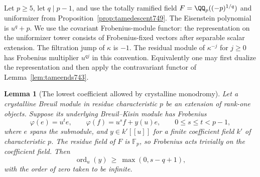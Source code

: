 \documentclass[a4paper,11pt]{article}
\newtheorem{lemma}[proposition]{Lemma}
\theoremstyle{definition}
\theoremstyle{remark}
\numberwithin{equation}{section}
\begin{document}
Let \(p\ge5\), let \(q\mid p-1\), and use the totally ramified
field \(F=\QQ_p((-p)^{1/q})\) and uniformizer from
Proposition~\ref{prop:tamedescent749}. The Eisenstein polynomial
is \(u^q+p\). We use the covariant Frobenius-module functor:
the representation on the uniformizer tower consists of
Frobenius-fixed vectors after separable scalar extension.
The filtration jump of \(\kappa\) is \(-1\).
The residual module of \(\kappa^{-j}\) for \(j\ge0\) has
Frobenius multiplier \(u^{qj}\) in this convention. Equivalently
one may first dualize the representation and then apply the
contravariant functor of Lemma~\ref{lem:tameends743}.

\begin{lemma}[The lowest coefficient allowed by crystalline monodromy]
\leavevmode\label{lem:lowestmonodromy752}
Let a crystalline Breuil module in residue characteristic \(p\)
be an extension of rank-one objects. Suppose its underlying
Breuil--Kisin module has Frobenius
\[
         \varphi(e)=u^t e,\qquad
         \varphi(f)=u^s f+y(u)e,\qquad 0\le s\le t<p-1 ,
\]
where \(e\) spans the submodule, and \(y\in k'[[u]]\) for a
finite coefficient field \(k'\) of characteristic \(p\). The
residue field of \(F\) is \(\mathbb F_p\), so Frobenius acts
trivially on the coefficient field. Then
\[
           \operatorname{ord}_u(y)\ \ge\ \max(0,s-q+1),
\]
with the order of zero taken to be infinite.
\end{lemma}
\end{document}

